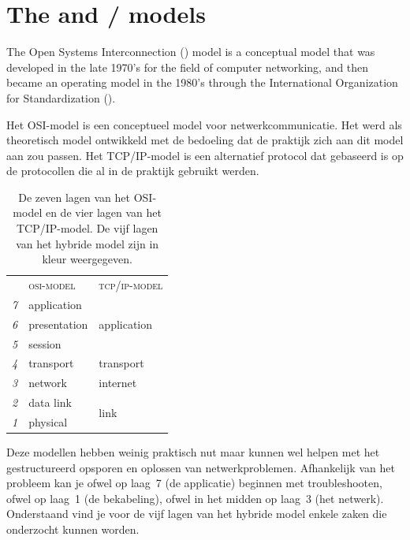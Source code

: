 \section{The  and / models}

The Open Systems Interconnection () model is a conceptual model that was developed in the late 1970's for the field of computer networking, and then became an operating model in the 1980's through the International Organization for Standardization ().


Het OSI-model is een conceptueel model voor netwerkcommunicatie.
Het werd als theoretisch model ontwikkeld met de bedoeling dat de praktijk zich aan dit model aan zou passen.
Het TCP/IP-model is een alternatief protocol dat gebaseerd is op de protocollen die al in de praktijk gebruikt werden.

\begin{table}[htp]
   \centering
   \begin{tabular}{rll}
              & \textsc{osi-model}           & \textsc{tcp/ip-model} \\[1ex]
   \textit{7} & application                  & \multirow{3}{*}{\textcolor{spot1}{application}} \\
   \textit{6} & presentation                 & \\
   \textit{5} & session                      & \\[1ex]
   \textit{4} & \textcolor{spot1}{transport} & transport \\[1ex]
   \textit{3} & \textcolor{spot1}{network}   & internet \\[1ex]
   \textit{2} & \textcolor{spot1}{data link} & \multirow{2}{*}{link} \\
   \textit{1} & \textcolor{spot1}{physical}  & \\
   \end{tabular}
   \caption{De zeven lagen van het OSI-model en de vier lagen van het TCP/IP-model.
   De vijf lagen van het hybride model zijn in kleur weergegeven.}
   \label{tab:osi-model}
\end{table}

Deze modellen hebben weinig praktisch nut maar kunnen wel helpen met het gestructureerd opsporen en oplossen van netwerkproblemen.
Afhankelijk van het probleem kan je ofwel op laag~7 (de applicatie) beginnen met troubleshooten, ofwel op laag~1 (de bekabeling), ofwel in het midden op laag~3 (het netwerk).
Onderstaand vind je voor de vijf lagen van het hybride model enkele zaken die onderzocht kunnen worden.


